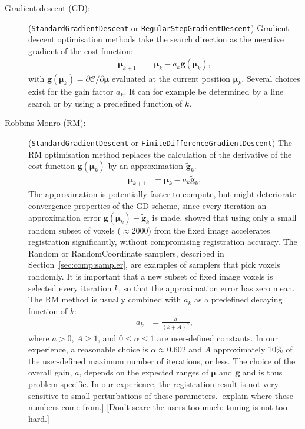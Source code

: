 \documentclass[]{report}
\newcommand{\vmu}{\bm{\mu}}
\begin{document}
\begin{description}
\item[Gradient descent (GD):] (\texttt{StandardGradientDescent}
or \texttt{RegularStepGradientDescent}) Gradient descent optimisation
methods take the search direction as the negative gradient of the
cost function:
\begin{align}
\vmu_{k+1} &= \vmu_k - a_k \bm{g}(\vmu_k),\label{eq:gd}
\end{align}
with $\bm{g}(\vmu_k) = \partial \mathcal{C} / \partial \vmu$
evaluated at the current position $\vmu_k$. Several choices exist for
the gain factor $a_k$. It can for example be determined by a line
search or by using a predefined function of $k$.

\item[Robbins-Monro (RM):] (\texttt{StandardGradientDescent}
or \texttt{FiniteDifferenceGradientDescent}) The RM optimisation
method replaces the calculation of the derivative of the cost
function $\bm{g}(\vmu_k)$ by an approximation $\widetilde{\bm{g}}_k$.
\begin{align}
\vmu_{k+1} &= \vmu_k - a_k \widetilde{\bm{g}}_k,\label{eq:RM}
\end{align}
The approximation is potentially faster to compute, but might
deteriorate convergence properties of the GD scheme, since every
iteration an approximation error $\bm{g}(\vmu_k) -
\widetilde{\bm{g}}_k$ is made. \citet{KleinEA07} showed that using
only a small random subset of voxels ($\approx 2000$) from the fixed
image accelerates registration significantly, without compromising
registration accuracy. The Random or RandomCoordinate samplers,
described in Section~\ref{sec:comp:sampler}, are examples of samplers
that pick voxels randomly. It is important that a new subset of fixed
image voxels is selected every iteration $k$, so that the
approximation error has zero mean. The RM method is usually combined
with $a_k$ as a predefined decaying function of $k$:
\begin{align}
a_k &= \frac{a}{(k+A)^{\alpha}},\label{eq:gain}
\end{align}
where $a > 0$, $A \ge 1$, and $0 \le \alpha \le 1$ are user-defined
constants. In our experience, a reasonable choice is $\alpha \approx
0.602$ and $A$ approximately 10\% of the user-defined maximum number
of iterations, or less. The choice of the overall gain, $a$, depends
on the expected ranges of $\vmu$ and $\bm{g}$ and is thus
problem-specific. In our experience, the registration result is not
very sensitive to small perturbations of these parameters. [explain
where these numbers come from.] [Don't scare the users too much:
tuning is not too hard.]
\end{description}
\end{document}
